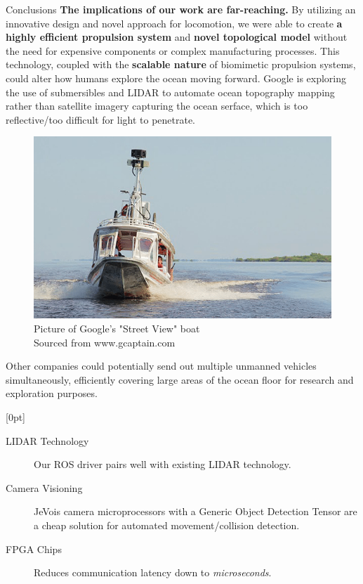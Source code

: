 \documentclass[final, 16pt]{beamer}
\newlength{\colwidth}
\begin{document}
\begin{frame}[t]
\begin{columns}[t]
\begin{column}{\colwidth}
\begin{block}{Conclusions}
    \textbf{The implications of our work are far-reaching.} By utilizing an innovative design and novel approach for locomotion, we were able to create \textbf{a highly efficient propulsion system} and \textbf{novel topological model} without the need for expensive components or complex manufacturing processes. This technology, coupled with the \textbf{scalable nature} of biomimetic propulsion systems, could alter how humans explore the ocean moving forward. Google is exploring the use of submersibles and LIDAR to automate ocean topography mapping rather than satellite imagery capturing the ocean serface, which is too reflective/too difficult for light to penetrate.
    \begin{figure}
      \centering
      \includegraphics[width=\linewidth, height=0.4\linewidth]{img/Street_View_Boat.png}
      \caption{Picture of Google's "Street View" boat \\ Sourced from www.gcaptain.com}
      \label{fig:street-view-boat}
    \end{figure} 
    Other companies could potentially send out multiple unmanned vehicles simultaneously, efficiently covering large areas of the ocean floor for research and exploration purposes.

    [0pt]

    \vspace{0.5cm}

    \begin{description}
      \item[LIDAR Technology] Our ROS driver pairs well with existing LIDAR technology.
      \item[Camera Visioning] JeVois camera microprocessors with a Generic Object Detection Tensor are a cheap solution for automated movement/collision detection.
      \item[FPGA Chips] Reduces communication latency down to \emph{microseconds}.    
    \end{description}


\end{block}
\end{column}
\end{columns}
\end{frame}
\end{document}
